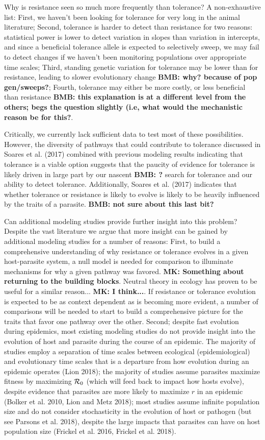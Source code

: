 \documentclass{article}
\newcommand{\mk}[1]{{\bf \color{red} MK: #1}}
\newcommand{\bb}[1]{{\bf \color{blue} BMB: #1}}
\newcommand{\rzero}{{\cal R}_0\xspace}
\begin{document}
Why is resistance seen so much more frequently than tolerance? A non-exhaustive list: First, we haven't been looking for tolerance for very long in the animal literature; Second, tolerance is harder to detect than resistance for two reasons: statistical power is lower to detect variation in slopes than variation in intercepts, and since a beneficial tolerance allele is expected to selectively sweep, we may fail to detect changes if we haven't been monitoring populations over appropriate time scales; Third, standing genetic variation for tolerance may be lower than for resistance, leading to slower evolutionary change \bb{why? because of pop gen/sweeps?}; Fourth, tolerance may either be more costly, or less beneficial than resistance \bb{this explanation is at a different level from the others; begs the question slightly (i.e, what would the mechanistic reason be for this?}.

Critically, we currently lack sufficient data to test most of these possibilities. However, the diversity of pathways that could contribute to tolerance discussed in Soares et al. (2017) combined with previous modeling results indicating that tolerance is a viable option suggests that the paucity of evidence for tolerance is likely driven in large part by our nascent \bb{?} search for tolerance and our ability to detect tolerance. Additionally, Soares et al. (2017) indicates that whether tolerance or resistance is likely to evolve is likely to be heavily influenced by the traits of a parasite. \bb{not sure about this last bit?}

Can additional modeling studies provide further insight into this problem? Despite the vast literature we argue that more insight can be gained by additional modeling studies for a number of reasons: First, to build a comprehensive understanding of why resistance or tolerance evolves in a given host-parasite system, a null model is needed for comparison to illuminate mechanisms for why a given pathway was favored. \mk{Something about returning to the building blocks}. Neutral theory in ecology has proven to be useful for a similar reason... \mk{I think...}. If resistance or tolerance evolution is expected to be as context dependent as is becoming more evident, a number of comparisons will be needed to start to build a comprehensive picture for the traits that favor one pathway over the other. Second; despite fast evolution during epidemics, most existing modeling studies do not provide insight into the evolution of host and parasite during the course of an epidemic. The majority of studies employ a separation of time scales between ecological (epidemiological) and evolutionary time scales that is a departure from how evolution during an epidemic operates (Lion 2018); the majority of studies assume parasites maximize fitness by maximizing $\rzero$ (which will feed back to impact how hosts evolve), despite evidence that parasites are more likely to maximize $r$ in an epidemic (Bolker et al. 2010, Lion and Metz 2018); most studies assume infinite population size and do not consider stochasticity in the evolution of host or pathogen (but see Parsons et al. 2018), despite the large impacts that parasites can have on host population size (Frickel et al. 2016, Frickel et al. 2018).
\end{document}
